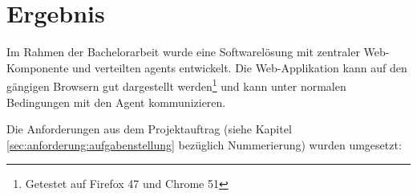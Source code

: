 \begin{comment}
Ergebnisse der Arbeit: was wurde erreicht, was wurde nicht erreicht, Ursachen.
Dieser Abschnitt richtet sich an den speziell für das entsprechende Fachgebiet
interessierten Ingenieur. Er soll es ihm ermöglichen, die für die Problemlösung
gemachten Überlegungen zu verstehen und nachzuvollziehen. Theoretische
Grundlagen sind nur so weit auszuarbeiten, als dies für die Lösung der Aufgabe
nötig ist (keine Lehrbücher schreiben). Die Erkenntnisse aus den theoretischen
Untersuchungen sind wenn immer möglich direkt mit der Problemlösung zu
verknüpfen.

Schlussfolgerungen, Bewertung der Ergebnisse.
Die Schlussfolgerungen bilden zusammen mit der Zusammenfassung die
wichtigsten Abschnitte eines Berichts und sollen daher am sorgfältigsten
ausgearbeitet sein. Die Schlussfolgerungen enthalten eine Zusammenfassung
und Beurteilung der Resultate (Vergleich mit anderen Lösungen, was wurde
erreicht, was nicht, was bleibt noch zu tun, was würde man nun anders tun). In
den Schlussfolgerungen soll auch ein Ausblick auf das weitere Vorgehen bzw.
auf die Bedeutung der erreichten Ergebnisse gegeben werden.

Installationsanleitung vorhanden (inklusive verwendete Entwicklungsumgebung und Werkzeuge), Test-Logs dokumentiert (bei Systemen mit User Interfaces: Dokumentation der Usability Tests)

Ideen für Schlussfolgerung:
* fehlendes Know-How?
* Positives
* negatives
* Vor-/Nachteile Rails? Was wenn ohne Rails gemacht?
\end{comment}

\chapter{Ergebnis}
\label{results}

Im Rahmen der Bachelorarbeit wurde eine Softwarelösung mit zentraler Web-Komponente und verteilten \glspl{agent} entwickelt. Die Web-Applikation kann auf den gängigen Browsern gut dargestellt werden\footnote{Getestet auf Firefox 47 und Chrome 51} und kann unter normalen Bedingungen mit den Agent kommunizieren.

Die Anforderungen aus dem Projektauftrag (siehe Kapitel \ref{sec:anforderung:aufgabenstellung} bezüglich Nummerierung) wurden umgesetzt:

